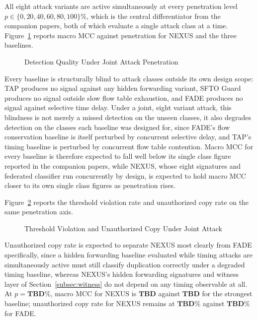 \documentclass[lettersize,journal]{IEEEtran}
\theoremstyle{plain}
\theoremstyle{remark}
\newcommand{\TBD}{\textbf{TBD}} %
\begin{document}
	All eight attack variants are active simultaneously at every penetration
	level $p \in \{0,20,40,60,80,100\}\%$, which is the central
	differentiator from the companion papers, both of which evaluate a
	single attack class at a time. Figure~\ref{fig:n1_mcc} reports macro
	MCC against penetration for NEXUS and the three baselines.
	\begin{figure}[!t]
		\centering
		\caption{Detection Quality Under Joint Attack Penetration}
		\label{fig:n1_mcc}
	\end{figure}
	Every baseline is structurally blind to attack classes outside its own
	design scope: TAP produces no signal against any hidden forwarding
	variant, SFTO Guard produces no signal outside slow flow table
	exhaustion, and FADE produces no signal against selective time delay.
	Under a joint, eight variant attack, this blindness is not merely a
	missed detection on the unseen classes, it also degrades detection on
	the classes each baseline was designed for, since FADE's flow
	conservation baseline is itself perturbed by concurrent selective delay,
	and TAP's timing baseline is perturbed by concurrent flow table
	contention. Macro MCC for every baseline is therefore expected to fall
	well below its single class figure reported in the companion papers,
	while NEXUS, whose eight signatures and federated classifier run
	concurrently by design, is expected to hold macro MCC closer to its own
	single class figures as penetration rises.
	
	Figure~\ref{fig:n1_tvr_ucr} reports the threshold violation rate and
	unauthorized copy rate on the same penetration axis.
	\begin{figure}[!t]
		\centering
		\caption{Threshold Violation and Unauthorized Copy Under Joint Attack}
		\label{fig:n1_tvr_ucr}
	\end{figure}
	Unauthorized copy rate is expected to separate NEXUS most clearly from
	FADE specifically, since a hidden forwarding baseline evaluated while
	timing attacks are simultaneously active must still classify duplication
	correctly under a degraded timing baseline, whereas NEXUS's hidden
	forwarding signatures and witness layer of
	Section~\ref{subsec:witness} do not depend on any timing observable at
	all. At $p{=}\TBD\%$, macro MCC for NEXUS is $\TBD$ against $\TBD$ for
	the strongest baseline; unauthorized copy rate for NEXUS remains at
	$\TBD\%$ against $\TBD\%$ for FADE.
	
\end{document}
